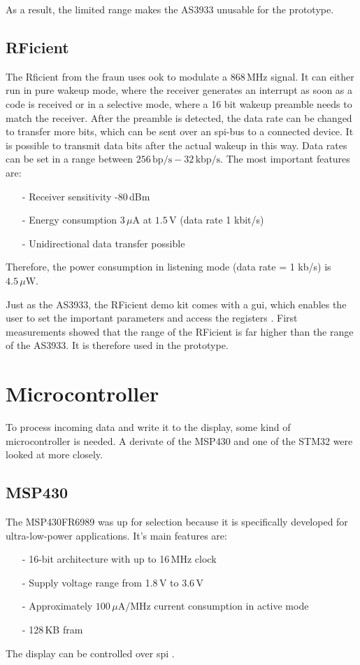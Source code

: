 As a result, the limited range makes the AS3933 unusable for the prototype. 

\subsection{RFicient}
The Rficient from the \acs{fraun} uses \acs{ook} to modulate a 868\,MHz signal.
It can either run in pure wakeup mode, where the receiver generates an interrupt as soon as a code is received or in a selective mode, where a 16 bit wakeup preamble needs to match the receiver. 
After the preamble is detected, the data rate can be changed to transfer more bits, which can be sent over an \acs{spi}-bus to a connected device.
It is possible to transmit data bits after the actual wakeup in this way.
Data rates can be set in a range between $256\,\text{bp/s}-32\,\text{kbp/s}$.
The most important features are:
\begin{itemize}
	\item[-] Receiver sensitivity -80\,dBm
	\item[-] Energy consumption $3\,\mu\text{A}$ at $1.5\,\text{V}$ (data rate 1 kbit/s)
	\item[-] Unidirectional data transfer possible	
\end{itemize}
Therefore, the power consumption in listening mode (data rate = 1 kb/s) is $4.5\,\mu\text{W}$.

Just as the AS3933, the RFicient demo kit comes with a \acs{gui}, which enables the user to set the important parameters and access the registers \cite{rficient}.
First measurements showed that the range of the RFicient is far higher than the range of the AS3933.
It is therefore used in the prototype.

\section{Microcontroller}
To process incoming data and write it to the display, some kind of microcontroller is needed.
A derivate of the MSP430 and one of the STM32 were looked at more closely.

\subsection{MSP430}
The MSP430FR6989 was up for selection because it is specifically developed for ultra-low-power applications.
It's main features are:
\begin{itemize}
	\item[-] 16-bit architecture with up to 16\,MHz clock
	\item[-] Supply voltage range from 1.8\,V to 3.6\,V
	\item[-] Approximately  $100\,\mu\text{A}/\text{MHz}$ current consumption in active mode
	\item[-] 128\,KB \acf{fram}
\end{itemize}
The display can be controlled over \acs{spi}  \cite{msp430}.

